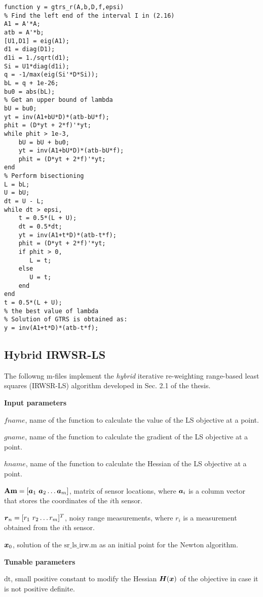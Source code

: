 \begin{lstlisting}
function y = gtrs_r(A,b,D,f,epsi)
% Find the left end of the interval I in (2.16)
A1 = A'*A;
atb = A'*b;
[U1,D1] = eig(A1);
d1 = diag(D1);
d1i = 1./sqrt(d1);
Si = U1*diag(d1i);
q = -1/max(eig(Si'*D*Si));
bL = q + 1e-26;
bu0 = abs(bL);
% Get an upper bound of lambda
bU = bu0;
yt = inv(A1+bU*D)*(atb-bU*f);
phit = (D*yt + 2*f)'*yt;
while phit > 1e-3,
    bU = bU + bu0;
    yt = inv(A1+bU*D)*(atb-bU*f);
    phit = (D*yt + 2*f)'*yt;
end
% Perform bisectioning
L = bL;
U = bU;
dt = U - L;
while dt > epsi,
    t = 0.5*(L + U);
    dt = 0.5*dt;
    yt = inv(A1+t*D)*(atb-t*f);
    phit = (D*yt + 2*f)'*yt;
    if phit > 0,
       L = t;
    else
       U = t;
    end
end
t = 0.5*(L + U);
% the best value of lambda
% Solution of GTRS is obtained as:
y = inv(A1+t*D)*(atb-t*f);
\end{lstlisting}

\subsection{Hybrid IRWSR-LS}

The followng m-files implement the \textit{hybrid} iterative re-weighting range-based least squares (IRWSR-LS) algorithm developed in Sec. 2.1 of the thesis. 

\phantom{m}

\noindent
\textbf{Input parameters}

\noindent
$fname$, name of the function to calculate the value of the LS objective at a point.

\noindent
$gname$, name of the function to calculate the gradient of the LS objective at a point.

\noindent
$hname$, name of the function to calculate the Hessian of the LS objective at a point.

\noindent
$\mbox{\textbf{Am}} = [\mbox{\boldmath$a$}_1 \ \mbox{\boldmath$a$}_2 \ldots \mbox{\boldmath$a$}_m]$, matrix of sensor locations, where $\mbox{\boldmath$a$}_i$ is a column vector that stores the coordinates of the $i$th sensor.

\noindent
$\mbox{\boldmath$r$}_n = [r_1 \ r_2 \ldots r_m]^T$, noisy range measurements, where $r_i$ is a measurement obtained from the $i$th sensor.

\noindent
$\mbox{\boldmath$x$}_0$, solution of the $\mbox{sr\_ls\_irw.m}$ as an initial point for the Newton algorithm.

\noindent
\textbf{Tunable parameters}

\noindent
$\mbox{dt}$, small positive constant to modify the Hessian $\mbox{\boldmath$H$}(\mbox{\boldmath$x$})$ of the objective in case it is not positive definite.

